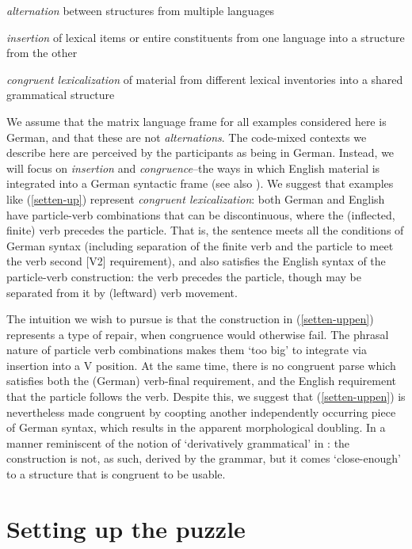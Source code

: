 \documentclass[output=paper]{langscibook}
\begin{document}
\ea\label{muyskentypes}
\begin{description}
\item \textit{alternation} between structures from multiple languages
\item \textit{insertion} of lexical items or entire constituents from one language into a structure from the other
\item \textit{congruent lexicalization} of material from different lexical inventories into a shared grammatical structure
\end{description}
\z

We assume that the matrix language frame for all examples considered here is German, and that these are not \textit{alternations}. The code-mixed contexts we describe here are perceived by the participants as being in German. Instead, we will focus on \textit{insertion} and \textit{congruence}--the ways in which English material is integrated into a German syntactic frame (see also \citealp{myersscotton93}). We suggest that examples like (\ref{setten-up}) represent \textit{congruent lexicalization}: both German and English have particle-verb combinations that can be discontinuous, where the (inflected, finite) verb precedes the particle. That is, the sentence meets all the conditions of German syntax (including separation of the finite verb and the particle to meet the verb second [V2] requirement), and also satisfies the English syntax of the particle-verb construction: the verb precedes the particle, though may be separated from it by (leftward) verb movement.

The intuition we wish to pursue is that the construction in (\ref{setten-uppen}) represents a type of repair, when congruence would otherwise fail. The phrasal nature of particle verb combinations makes them `too big' to integrate via insertion into a V position. At the same time, there is no congruent parse which satisfies both the (German) verb-final requirement, and the English requirement that the particle follows the verb. Despite this, we suggest that (\ref{setten-uppen}) is nevertheless made congruent by coopting another independently occurring piece of German syntax, which results in the apparent morphological doubling. In a manner reminiscent of the notion of `derivatively grammatical' in \cite[242]{chomsky65}: the construction is not, as such, derived by the grammar, but it comes `close-enough' to a structure that is congruent to be usable.

 

\section{Setting up the puzzle}
\end{document}
